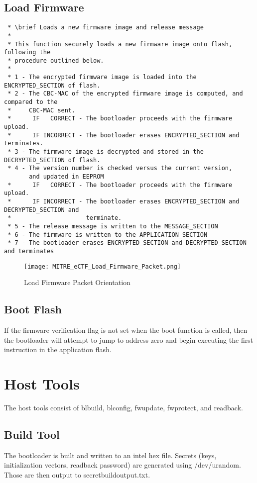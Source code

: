 \documentclass[11pt]{article}
\begin{document}
\subsection{Load Firmware}
\begin{verbatim}
 * \brief Loads a new firmware image and release message
 * 
 * This function securely loads a new firmware image onto flash, following the
 * procedure outlined below.
 * 
 * 1 - The encrypted firmware image is loaded into the ENCRYPTED_SECTION of flash.
 * 2 - The CBC-MAC of the encrypted firmware image is computed, and compared to the
 *	   CBC-MAC sent.
 *		IF   CORRECT - The bootloader proceeds with the firmware upload.
 *		IF INCORRECT - The bootloader erases ENCRYPTED_SECTION and terminates.
 * 3 - The firmware image is decrypted and stored in the DECRYPTED_SECTION of flash.
 * 4 - The version number is checked versus the current version,
	   and updated in EEPROM
 *		IF   CORRECT - The bootloader proceeds with the firmware upload.
 *		IF INCORRECT - The bootloader erases ENCRYPTED_SECTION and DECRYPTED_SECTION and
 *					   terminate.
 * 5 - The release message is written to the MESSAGE_SECTION
 * 6 - The firmware is written to the APPLICATION_SECTION
 * 7 - The bootloader erases ENCRYPTED_SECTION and DECRYPTED_SECTION and terminates
\end{verbatim}
\begin{figure}[!h]
\begin{center}
\texttt{[image: MITRE\_eCTF\_Load\_Firmware\_Packet.png]}
\caption{Load Firmware Packet Orientation}
\end{center}
\end{figure}
\subsection{Boot Flash}
If the firmware verification flag is not set when the boot function is called, then the bootloader will attempt to jump to address zero and begin executing the first instruction in the application flash.
\section{Host Tools}
The host tools consist of bl\textunderscore build, bl\textunderscore config, fw\textunderscore update, fw\textunderscore protect, and readback.
\subsection{Build Tool}
The bootloader is built and written to an intel hex file. Secrets (keys, initialization vectors, readback password) are generated using /dev/urandom. Those are then output to secret\textunderscore build\textunderscore output.txt.
\end{document}
